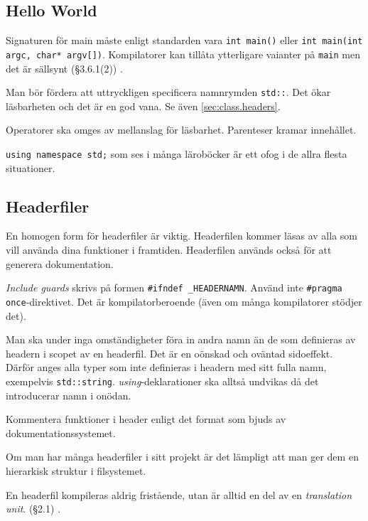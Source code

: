 \documentclass[a4paper,portrait]{miunart} %
\begin{document}
\subsection{Hello World}
\label{sec:helloworld}


Signaturen för main måste enligt standarden vara \texttt{int main()} eller 
\texttt{int main(int argc, char* argv[])}.  Kompilatorer kan tillåta 
ytterligare vaianter på \texttt{main} men det är sällsynt (§3.6.1(2))
\cite{ISO:n3337}. 

Man bör fördera att uttryckligen specificera namnrymden \texttt{std::}. Det 
ökar läsbarheten och det är en god vana. Se även \ref{sec:class.headers}.

Operatorer ska omges av mellanslag för läsbarhet. Parenteser kramar innehållet.

\texttt{using namespace std;} som ses i många läroböcker är ett ofog i de allra 
flesta situationer. 

\pagebreak
\subsection{Headerfiler}
\label{sec:headers}
En homogen form för headerfiler är viktig.  Headerfilen kommer läsas av alla 
som vill använda dina funktioner i framtiden. Headerfilen används också för att 
generera dokumentation. 




\emph{Include guards} skrivs på formen \texttt{\#ifndef \_HEADERNAMN}. Använd 
inte \texttt{\#pragma once}-direktivet. Det är kompilatorberoende (även om 
många kompilatorer stödjer det).

Man ska under inga omständigheter föra in andra namn än de som definieras av 
headern i scopet av en headerfil. Det är en oönskad och oväntad sidoeffekt.  
Därför anges alla typer som inte definieras i headern med sitt fulla namn, 
exempelvis \texttt{std::string}. \emph{using}-deklarationer ska alltså undvikas 
då det introducerar namn i onödan.

Kommentera funktioner i header enligt det format som bjuds av 
dokumentationssystemet.

Om man har många headerfiler i sitt projekt är det lämpligt att man ger dem en 
hierarkisk struktur i filsystemet. 

En headerfil kompileras aldrig fristående, utan är alltid en del av en 
\emph{translation unit}. (§2.1) \cite{ISO:n3337}.
\end{document}
